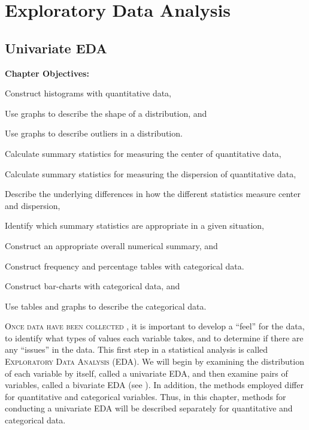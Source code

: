 \documentclass[10pt,openany]{book}\usepackage[]{graphicx}\usepackage[]{color}
\begin{document}
    \part{Exploratory Data Analysis}



\chapter{Univariate EDA} \label{chap:UnivEDA}
\begin{ChapObj}{\boxwidth}
  \textbf{Chapter Objectives:}
  \begin{Enumerate}
    \item Construct histograms with quantitative data,
    \item Use graphs to describe the shape of a distribution, and
    \item Use graphs to describe outliers in a distribution.
    \item Calculate summary statistics for measuring the center of quantitative data,
    \item Calculate summary statistics for measuring the dispersion of quantitative data,
    \item Describe the underlying differences in how the different statistics measure center and dispersion,
    \item Identify which summary statistics are appropriate in a given situation,
    \item Construct an appropriate overall numerical summary, and
    \item Construct frequency and percentage tables with categorical data.
    \item Construct bar-charts with categorical data, and
    \item Use tables and graphs to describe the categorical data.
  \end{Enumerate}
\end{ChapObj}

\minitoc
\newpage

\lettrine{O}{nce data have been collected} , it is important to develop a ``feel'' for the data, to identify what types of values each variable takes, and to determine if there are any ``issues'' in the data.  This first step in a statistical analysis is called \textsc{Exploratory Data Analysis} (EDA).  We will begin by examining the distribution of each variable by itself, called a univariate EDA, and then examine pairs of variables, called a bivariate EDA (see ).  In addition, the methods employed differ for quantitative and categorical variables.  Thus, in this chapter, methods for conducting a univariate EDA will be described separately for quantitative and categorical data.
\end{document}
